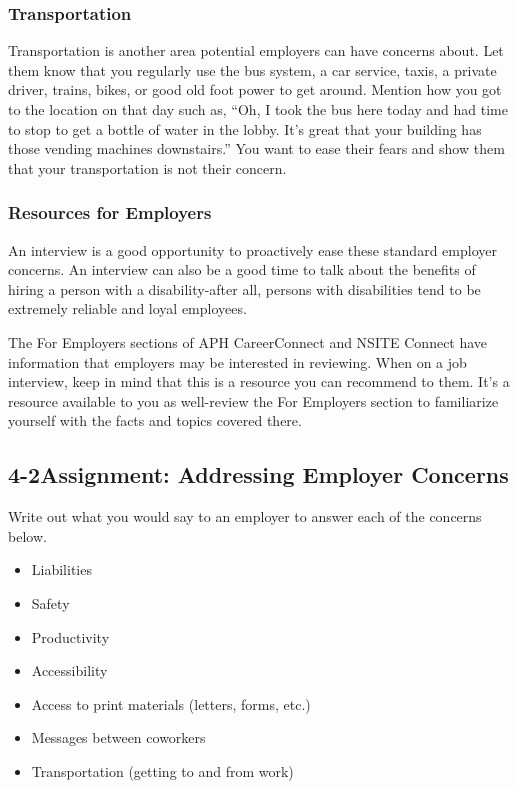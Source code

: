 \subsubsection*{Transportation}

Transportation is another area potential employers can have concerns about. Let them know that you regularly use the bus system, a car service, taxis, a private driver, trains, bikes, or good old foot power to get around. Mention how you got to the location on that day such as, ``Oh, I took the bus here today and had time to stop to get a bottle of water in the lobby. It's great that your building has those vending machines downstairs.'' You want to ease their fears and show them that your transportation is not their concern.

\subsubsection*{Resources for Employers}

An interview is a good opportunity to proactively ease these standard employer concerns. An interview can also be a good time to talk about the benefits of hiring a person with a disability-after all, persons with disabilities tend to be extremely reliable and loyal employees.

The For Employers sections of APH CareerConnect and NSITE Connect have information that employers may be interested in reviewing. When on a job interview, keep in mind that this is a resource you can recommend to them. It's a resource available to you as well-review the For Employers section to familiarize yourself with the facts and topics covered there.
\pagebreak \subsection*{4-2\quad Assignment: Addressing Employer Concerns}

Write out what you would say to an employer to answer each of the concerns below.
\begin{itemize}[leftmargin=1.0cm]
	\item Liabilities
	\item Safety
	\item Productivity
	\item Accessibility
	\item Access to print materials (letters, forms, etc.)
	\item Messages between coworkers
	\item Transportation (getting to and from work)
\end{itemize}

